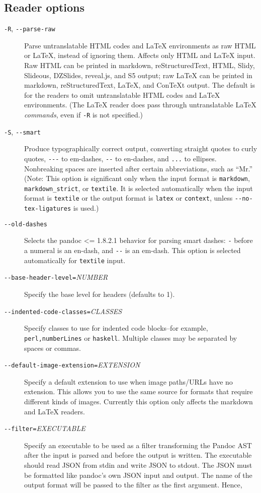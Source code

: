 \documentclass[]{article}
\begin{document}
\subsection{Reader options}

\begin{description}
\item[\texttt{-R}, \texttt{-{}-parse-raw}]
Parse untranslatable HTML codes and LaTeX environments as raw HTML or
LaTeX, instead of ignoring them. Affects only HTML and LaTeX input. Raw
HTML can be printed in markdown, reStructuredText, HTML, Slidy,
Slideous, DZSlides, reveal.js, and S5 output; raw LaTeX can be printed
in markdown, reStructuredText, LaTeX, and ConTeXt output. The default is
for the readers to omit untranslatable HTML codes and LaTeX
environments. (The LaTeX reader does pass through untranslatable LaTeX
\emph{commands}, even if \texttt{-R} is not specified.)
\item[\texttt{-S}, \texttt{-{}-smart}]
Produce typographically correct output, converting straight quotes to
curly quotes, \texttt{-{}-{}-} to em-dashes, \texttt{-{}-} to en-dashes,
and \texttt{...} to ellipses. Nonbreaking spaces are inserted after
certain abbreviations, such as ``Mr.'' (Note: This option is significant
only when the input format is \texttt{markdown},
\texttt{markdown\_strict}, or \texttt{textile}. It is selected
automatically when the input format is \texttt{textile} or the output
format is \texttt{latex} or \texttt{context}, unless
\texttt{-{}-no-tex-ligatures} is used.)
\item[\texttt{-{}-old-dashes}]
Selects the pandoc \textless{}= 1.8.2.1 behavior for parsing smart
dashes: \texttt{-} before a numeral is an en-dash, and \texttt{-{}-} is
an em-dash. This option is selected automatically for \texttt{textile}
input.
\item[\texttt{-{}-base-header-level=}\emph{NUMBER}]
Specify the base level for headers (defaults to 1).
\item[\texttt{-{}-indented-code-classes=}\emph{CLASSES}]
Specify classes to use for indented code blocks--for example,
\texttt{perl,numberLines} or \texttt{haskell}. Multiple classes may be
separated by spaces or commas.
\item[\texttt{-{}-default-image-extension=}\emph{EXTENSION}]
Specify a default extension to use when image paths/URLs have no
extension. This allows you to use the same source for formats that
require different kinds of images. Currently this option only affects
the markdown and LaTeX readers.
\item[\texttt{-{}-filter=}\emph{EXECUTABLE}]
Specify an executable to be used as a filter transforming the Pandoc AST
after the input is parsed and before the output is written. The
executable should read JSON from stdin and write JSON to stdout. The
JSON must be formatted like pandoc's own JSON input and output. The name
of the output format will be passed to the filter as the first argument.
Hence,


\end{description}
\end{document}
